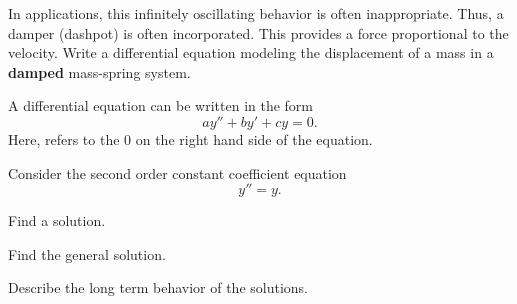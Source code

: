 \begin{applicationActivities}
\begin{activity}{5}
In applications, this infinitely oscillating behavior is often inappropriate.
\vfill
Thus, a damper (dashpot) is often incorporated.  This provides a force proportional to the velocity.
\vfill
Write a differential equation modeling the displacement of a mass in a \textbf{damped} mass-spring system.
\vfill
\end{activity}

\begin{definition}
A  differential equation can be written in the form
\[ay''+by'+cy=0.\]
Here,  refers to the \(0\) on the right hand side of the equation.
\end{definition}

\begin{activity}{15}
Consider the second order constant coefficient equation \[y''=y.\]
\begin{subactivity}
Find a solution.
\end{subactivity}
\begin{subactivity}
Find the general solution.
\end{subactivity}
\begin{subactivity}
Describe the long term behavior of the solutions.
\end{subactivity}
\end{activity}




\end{applicationActivities}

